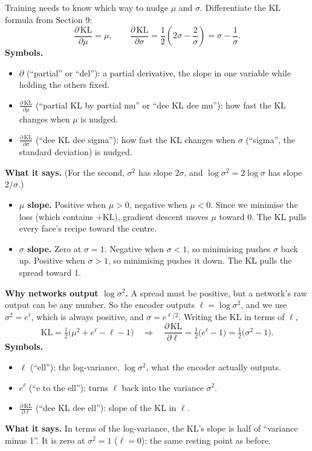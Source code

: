 Training needs to know which way to nudge $\mu$ and $\sigma$. Differentiate the KL formula from Section 9:
\[
\frac{\partial\,\mathrm{KL}}{\partial \mu} = \mu,
\qquad
\frac{\partial\,\mathrm{KL}}{\partial \sigma} = \frac{1}{2}\left(2\sigma - \frac{2}{\sigma}\right) = \sigma - \frac{1}{\sigma}.
\]
\textbf{Symbols.}
\begin{itemize}[leftmargin=1.5em, itemsep=0pt]
\item $\partial$ (``partial'' or ``del''): a partial derivative, the slope in one variable while holding the others fixed.
\item $\frac{\partial\,\mathrm{KL}}{\partial \mu}$ (``partial KL by partial mu'' or ``dee KL dee mu''): how fast the KL changes when $\mu$ is nudged.
\item $\frac{\partial\,\mathrm{KL}}{\partial \sigma}$ (``dee KL dee sigma''): how fast the KL changes when $\sigma$ (``sigma'', the standard deviation) is nudged.
\end{itemize}
\textbf{What it says.} (For the second, $\sigma^2$ has slope $2\sigma$, and $\log\sigma^2 = 2\log\sigma$ has slope $2/\sigma$.)
\begin{itemize}[leftmargin=1.5em]
\item \textbf{$\mu$ slope.} Positive when $\mu > 0$, negative when $\mu < 0$. Since we minimise the loss (which contains $+\mathrm{KL}$), gradient descent moves $\mu$ toward 0. The KL pulls every face's recipe toward the centre.
\item \textbf{$\sigma$ slope.} Zero at $\sigma = 1$. Negative when $\sigma < 1$, so minimising pushes $\sigma$ back up. Positive when $\sigma > 1$, so minimising pushes it down. The KL pulls the spread toward 1.
\end{itemize}
\textbf{Why networks output $\log\sigma^2$.} A spread must be positive, but a network's raw output can be any number. So the encoder outputs $\ell = \log\sigma^2$, and we use $\sigma^2 = e^{\ell}$, which is always positive, and $\sigma = e^{\ell/2}$. Writing the KL in terms of $\ell$,
\[
\mathrm{KL} = \tfrac{1}{2}\big(\mu^2 + e^{\ell} - \ell - 1\big)
\quad\Longrightarrow\quad
\frac{\partial\,\mathrm{KL}}{\partial \ell} = \tfrac{1}{2}\big(e^{\ell} - 1\big) = \tfrac{1}{2}\big(\sigma^2 - 1\big).
\]
\textbf{Symbols.}
\begin{itemize}[leftmargin=1.5em, itemsep=0pt]
\item $\ell$ (``ell''): the log-variance, $\log\sigma^2$, what the encoder actually outputs.
\item $e^{\ell}$ (``e to the ell''): turns $\ell$ back into the variance $\sigma^2$.
\item $\frac{\partial\,\mathrm{KL}}{\partial \ell}$ (``dee KL dee ell''): slope of the KL in $\ell$.
\end{itemize}
\textbf{What it says.} In terms of the log-variance, the KL's slope is half of ``variance minus 1''. It is zero at $\sigma^2 = 1$ ($\ell = 0$): the same resting point as before.

